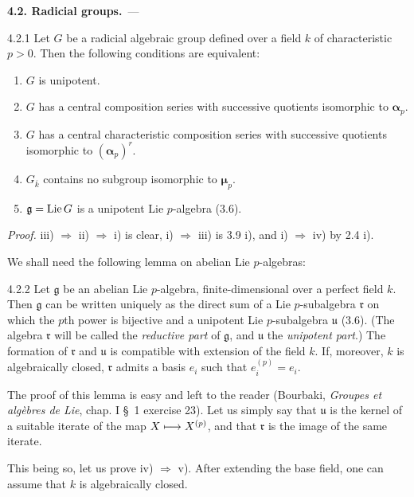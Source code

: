 \par\medskip\noindent\textbf{4.2. Radicial groups.}\ ---\par\label{XVII.4.2}
\begin{proposition}{4.2.1}\label{XVII.4.2.1}
Let $G$ be a radicial algebraic group defined over a field $k$ of characteristic $p>0$. Then the following conditions are equivalent:
\begin{enumerate}[label=\textup{\roman*)}]
\item $G$ is unipotent.
\item $G$ has a central composition series with successive quotients isomorphic to $\boldsymbol\alpha_p$.
\item $G$ has a central characteristic composition series with successive quotients isomorphic to $(\boldsymbol\alpha_p)^r$.
\item $G_{\overline k}$ contains no subgroup isomorphic to $\boldsymbol\mu_p$.
\item $\mathfrak g=\operatorname{Lie} G$ is a unipotent Lie $p$-algebra (3.6).
\end{enumerate}
\end{proposition}
\noindent\emph{Proof.} iii) $\Rightarrow$ ii) $\Rightarrow$ i) is clear, i) $\Rightarrow$ iii) is 3.9 i), and i) $\Rightarrow$ iv) by 2.4 i).

We shall need the following lemma on abelian Lie $p$-algebras:
\begin{lemma}{4.2.2}\label{XVII.4.2.2}
Let $\mathfrak g$ be an abelian Lie $p$-algebra, finite-dimensional over a perfect field $k$. Then $\mathfrak g$ can be written uniquely as the direct sum of a Lie $p$-subalgebra $\mathfrak r$ on which the $p$th power is bijective and a unipotent Lie $p$-subalgebra $\mathfrak u$ (3.6). (The algebra $\mathfrak r$ will be called the \emph{reductive part} of $\mathfrak g$, and $\mathfrak u$ the \emph{unipotent part}.) The formation of $\mathfrak r$ and $\mathfrak u$ is compatible with extension of the field $k$. If, moreover, $k$ is algebraically closed, $\mathfrak r$ admits a basis $e_i$ such that $e_i^{(p)}=e_i$.
\end{lemma}
The proof of this lemma is easy and left to the reader (\cf Bourbaki, \emph{Groupes et algèbres de Lie}, chap. I \S~1 exercise 23). Let us simply say that $\mathfrak u$ is the kernel of a suitable iterate of the map $X\longmapsto X^{(p)}$, and that $\mathfrak r$ is the image of the same iterate.

This being so, let us prove iv) $\Rightarrow$ v). After extending the base field, one can assume that $k$ is algebraically closed.

